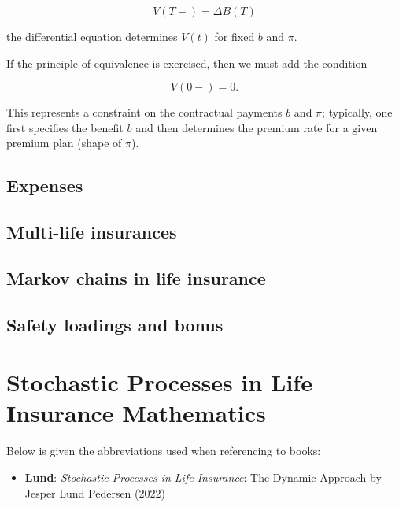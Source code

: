 \documentclass[a4paper,10pt,openany]{book}
\providecommand{\tightlist}{%
 \setlength{\itemsep}{0pt}\setlength{\parskip}{0pt}}
\begin{document}
\[
V(T-)=\Delta B(T)
\]

the differential equation determines \(V(t)\) for fixed \(b\) and \(\pi\).

If the principle of equivalence is exercised, then we must add the condition

\[
V(0-)=0.
\]

This represents a constraint on the contractual payments \(b\) and \(\pi\); typically, one first specifies the benefit \(b\) and then determines the premium rate for a given premium plan (shape of \(\pi\)).

\hypertarget{expenses}{%
\section{Expenses}\label{expenses}}

\hypertarget{multi-life-insurances}{%
\section{Multi-life insurances}\label{multi-life-insurances}}

\hypertarget{markov-chains-in-life-insurance}{%
\section{Markov chains in life insurance}\label{markov-chains-in-life-insurance}}

\hypertarget{safety-loadings-and-bonus}{%
\section{Safety loadings and bonus}\label{safety-loadings-and-bonus}}

\hypertarget{stochastic-processes-in-life-insurance-mathematics}{%
\chapter{Stochastic Processes in Life Insurance Mathematics}\label{stochastic-processes-in-life-insurance-mathematics}}

Below is given the abbreviations used when referencing to books:

\begin{itemize}
\tightlist
\item
  \textbf{Lund}: \emph{Stochastic Processes in Life Insurance}: The Dynamic Approach by Jesper Lund Pedersen (2022)\cite{lund2022}
\end{itemize}
\end{document}
